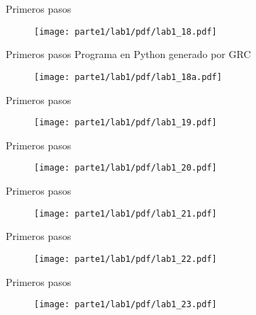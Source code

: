 \begin{frame}{Primeros pasos }
\begin{figure}[H]
\centering
\texttt{[image: parte1/lab1/pdf/lab1\_18.pdf]}
\end{figure}
\end{frame}

\begin{frame}{Primeros pasos }
Programa en Python generado por GRC
\begin{figure}[H]
\centering\texttt{[image: parte1/lab1/pdf/lab1\_18a.pdf]}
\end{figure}
\end{frame}

\begin{frame}{Primeros pasos }
\begin{figure}[H]
\centering
\texttt{[image: parte1/lab1/pdf/lab1\_19.pdf]}
\end{figure}
\end{frame}

\begin{frame}{Primeros pasos }
\begin{figure}[H]
\centering
\texttt{[image: parte1/lab1/pdf/lab1\_20.pdf]}
\end{figure}
\end{frame}

\begin{frame}{Primeros pasos }
\begin{figure}[H]
\centering
\texttt{[image: parte1/lab1/pdf/lab1\_21.pdf]}
\end{figure}
\end{frame}

\begin{frame}{Primeros pasos }
\begin{figure}[H]
\centering
\texttt{[image: parte1/lab1/pdf/lab1\_22.pdf]}
\end{figure}
\end{frame}

\begin{frame}{Primeros pasos }
\begin{figure}[H]
\centering
\texttt{[image: parte1/lab1/pdf/lab1\_23.pdf]}
\end{figure}
\end{frame}

